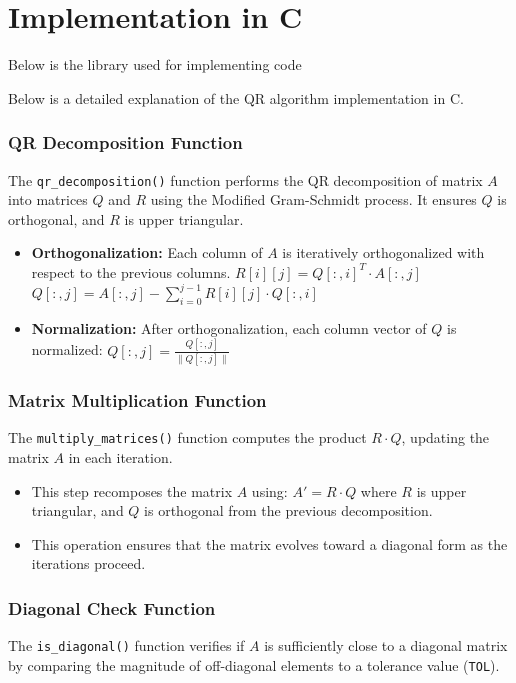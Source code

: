 \documentclass[12pt]{article}
\begin{document}
\section{Implementation in C}
Below is the library used for implementing code


Below is a detailed explanation of the QR algorithm implementation in C.

\subsubsection{QR Decomposition Function}
The \texttt{qr\_decomposition()} function performs the QR decomposition of matrix $A$ into matrices $Q$ and $R$ using the Modified Gram-Schmidt process. It ensures $Q$ is orthogonal, and $R$ is upper triangular.



\begin{itemize}
    \item \textbf{Orthogonalization:} Each column of $A$ is iteratively orthogonalized with respect to the previous columns.  
    $R[i][j] = Q[:, i]^T \cdot A[:, j]$  
    $Q[:, j] = A[:, j] - \sum_{i=0}^{j-1} R[i][j] \cdot Q[:, i]$
    \item \textbf{Normalization:} After orthogonalization, each column vector of $Q$ is normalized:  
    $Q[:, j] = \frac{Q[:, j]}{\|Q[:, j]\|}$
\end{itemize}

\subsubsection{Matrix Multiplication Function}
The \texttt{multiply\_matrices()} function computes the product $R \cdot Q$, updating the matrix $A$ in each iteration.



\begin{itemize}
    \item This step recomposes the matrix $A$ using:  
    $A' = R \cdot Q$  
    where $R$ is upper triangular, and $Q$ is orthogonal from the previous decomposition.
    \item This operation ensures that the matrix evolves toward a diagonal form as the iterations proceed.
\end{itemize}

\subsubsection{Diagonal Check Function}
The \texttt{is\_diagonal()} function verifies if $A$ is sufficiently close to a diagonal matrix by comparing the magnitude of off-diagonal elements to a tolerance value (\texttt{TOL}).
\end{document}
